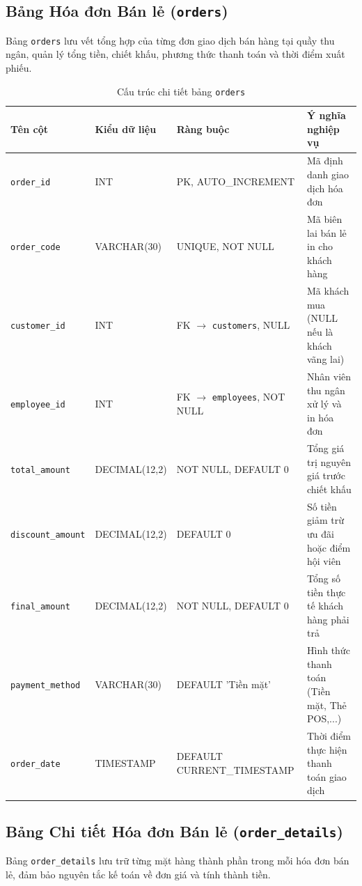 \documentclass[12pt,a4paper]{report}
\begin{document}
\subsection{Bảng Hóa đơn Bán lẻ (\texttt{orders})}
Bảng \texttt{orders} lưu vết tổng hợp của từng đơn giao dịch bán hàng tại quầy thu ngân, quản lý tổng tiền, chiết khấu, phương thức thanh toán và thời điểm xuất phiếu.

\begin{table}[H]
\centering
\footnotesize
\caption{Cấu trúc chi tiết bảng \texttt{orders}}
\label{tab:dict_orders}
\vspace{0.2cm}
\begin{tabularx}{\textwidth}{L{3.3cm} L{2.9cm} L{3.6cm} Y}
\toprule
\textbf{Tên cột} & \textbf{Kiểu dữ liệu} & \textbf{Ràng buộc} & \textbf{Ý nghĩa nghiệp vụ} \\
\midrule
\texttt{order\_id} & INT & PK, AUTO\_INCREMENT & Mã định danh giao dịch hóa đơn \\
\texttt{order\_code} & VARCHAR(30) & UNIQUE, NOT NULL & Mã biên lai bán lẻ in cho khách hàng \\
\texttt{customer\_id} & INT & FK $\to$ \texttt{customers}, NULL & Mã khách mua (NULL nếu là khách vãng lai) \\
\texttt{employee\_id} & INT & FK $\to$ \texttt{employees}, NOT NULL & Nhân viên thu ngân xử lý và in hóa đơn \\
\texttt{total\_amount} & DECIMAL(12,2) & NOT NULL, DEFAULT 0 & Tổng giá trị nguyên giá trước chiết khấu \\
\texttt{discount\_amount} & DECIMAL(12,2) & DEFAULT 0 & Số tiền giảm trừ ưu đãi hoặc điểm hội viên \\
\texttt{final\_amount} & DECIMAL(12,2) & NOT NULL, DEFAULT 0 & Tổng số tiền thực tế khách hàng phải trả \\
\texttt{payment\_method} & VARCHAR(30) & DEFAULT 'Tiền mặt' & Hình thức thanh toán (Tiền mặt, Thẻ POS,...) \\
\texttt{order\_date} & TIMESTAMP & DEFAULT CURRENT\_TIMESTAMP & Thời điểm thực hiện thanh toán giao dịch \\
\bottomrule
\end{tabularx}
\end{table}

\newpage
\subsection{Bảng Chi tiết Hóa đơn Bán lẻ (\texttt{order\_details})}
Bảng \texttt{order\_details} lưu trữ từng mặt hàng thành phần trong mỗi hóa đơn bán lẻ, đảm bảo nguyên tắc kế toán về đơn giá và tính thành tiền.
\end{document}
